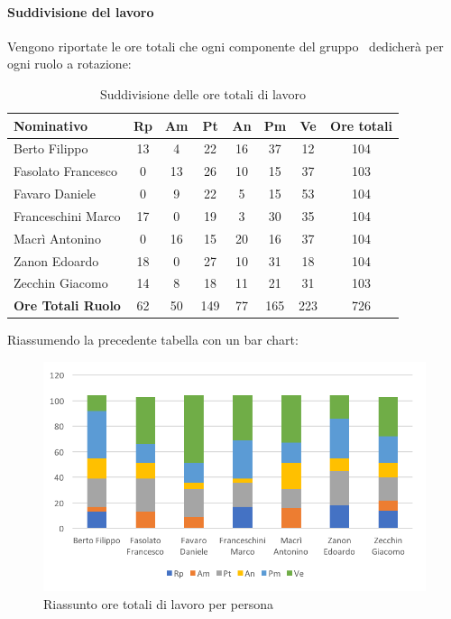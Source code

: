 \documentclass[../PianoDiProgetto.tex]{subfiles}
\begin{document}
			\paragraph{Suddivisione del lavoro}
			Vengono riportate le ore totali che ogni componente del gruppo \kpanic\ dedicherà per ogni ruolo a rotazione:
			\begin{table}[h]
				\begin{tabularx}{\textwidth}{l * {6}{C} c}
				\toprule
				\textbf{Nominativo} & \textbf{Rp} & \textbf{Am} & \textbf{Pt} & \textbf{An} & \textbf{Pm} & \textbf{Ve} & \textbf{Ore totali} \\
				\midrule
				Berto Filippo &	13 & 4 & 22 & 16 & 37 & 12 & 104 \\
				Fasolato Francesco & 0 & 13 & 26 & 10 & 15 & 37 & 103 \\
				Favaro Daniele & 0 & 9 & 22 & 5 & 15 & 53 & 104 \\
				Franceschini Marco & 17 & 0 & 19 & 3 & 30 & 35 & 104 \\
				Macrì Antonino & 0 & 16 & 15 & 20 & 16 & 37 & 104 \\
				Zanon Edoardo &	18 & 0 & 27 & 10 & 31 & 18 & 104 \\
				Zecchin Giacomo & 14 & 8 & 18 & 11 & 21 & 31 & 103 \\
				\midrule			
				\textbf{Ore Totali Ruolo} & 62 & 50 & 149 & 77 & 165 & 223 & 726 \\
				\bottomrule
				\end{tabularx}
				\caption{Suddivisione delle ore totali di lavoro}		
			\end{table}

			Riassumendo la precedente tabella con un bar chart:
			\begin{figure}[!h]
				\centering
				\includegraphics[width=\textwidth]{Preventivo/Immagini/rendicontato_oreRuoloPersona.png}
				\caption{Riassunto ore totali di lavoro per persona}
			\end{figure}	
			
\end{document}
